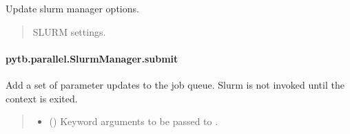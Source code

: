 \documentclass[letterpaper,10pt,english,openany,oneside]{sphinxmanual}
\begin{document}
\begin{fulllineitems}
\begin{fulllineitems}
\label{\detokenize{api/pytb.parallel.SlurmManager.set_:pytb.parallel.SlurmManager.set_}}
\pysigstartsignatures
{}
\pysigstopsignatures
\sphinxAtStartPar
Update slurm manager options.
\begin{quote}\begin{description}
\sphinxAtStartPar
{} \textendash{} SLURM settings.

\end{description}\end{quote}

\end{fulllineitems}


\sphinxstepscope


\paragraph{pytb.parallel.SlurmManager.submit}
\label{\detokenize{api/pytb.parallel.SlurmManager.submit:pytb-parallel-slurmmanager-submit}}\label{\detokenize{api/pytb.parallel.SlurmManager.submit::doc}}

\begin{fulllineitems}
\label{\detokenize{api/pytb.parallel.SlurmManager.submit:pytb.parallel.SlurmManager.submit}}
\pysigstartsignatures
{}
\pysigstopsignatures
\sphinxAtStartPar
Add a set of parameter updates to the job queue.
Slurm is not invoked until the context is exited.
\begin{quote}\begin{description}
\begin{itemize}
\item {} 
\sphinxAtStartPar
{} () \textendash{} Keyword arguments to be passed to
{\hyperref[\detokenize{api/pytb.parallel.MPRunner.run:pytb.parallel.MPRunner.run}]{}}.


\end{itemize}
\end{description}
\end{quote}
\end{fulllineitems}
\end{fulllineitems}
\end{document}
